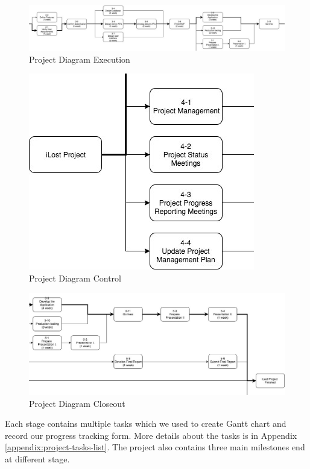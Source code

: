 \documentclass[12pt,a4paper]{article}
\begin{document}
        \begin{figure}[H]
          \centering
          \includegraphics[width=1\textwidth]{assets/9-project-diagram-3.jpg}
          \caption{Project Diagram Execution}
          \label{fig:Project Diagram Execution}
        \end{figure}

        \begin{figure}[H]
          \centering
          \includegraphics[width=.5\textwidth]{assets/9-project-diagram-4.jpg}
          \caption{Project Diagram Control}
          \label{fig:Project Diagram Control}
        \end{figure}

        \begin{figure}[H]
          \centering
          \includegraphics[width=1\textwidth]{assets/9-project-diagram-5.jpg}
          \caption{Project Diagram Closeout}
          \label{fig:Project Diagram Closeout}
        \end{figure}

        Each stage contains multiple tasks which we used to create Gantt chart and record our progress tracking form. More details about the tasks is in Appendix \ref{appendix:project-tasks-list}. The project also contains three main milestones end at different stage.  
\end{document}
